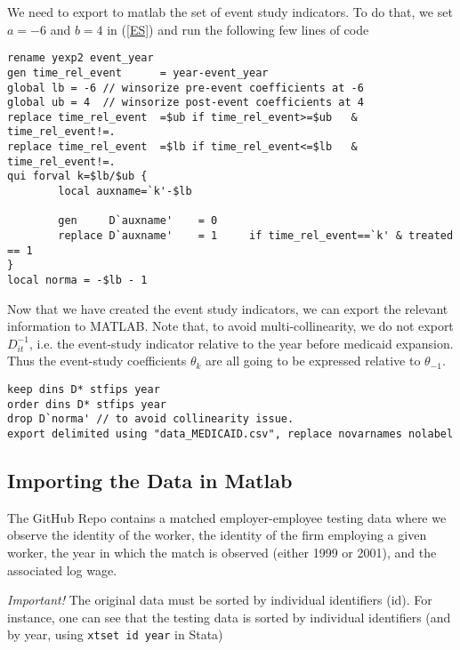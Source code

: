 \documentclass[11pt]{article}
\begin{document}
We need to export to matlab the set of event study indicators. To do that, we set $a = -6$ and $b=4$ in (\ref{ES}) and run the following few lines of code


\begin{lstlisting}
rename yexp2 event_year
gen time_rel_event 		= year-event_year
global lb = -6 // winsorize pre-event coefficients at -6
global ub = 4  // winsorize post-event coefficients at 4
replace time_rel_event	=$ub if time_rel_event>=$ub   & time_rel_event!=.
replace time_rel_event	=$lb if time_rel_event<=$lb   & time_rel_event!=.
qui forval k=$lb/$ub {
		local auxname=`k'-$lb
		
		gen 	D`auxname'	  = 0
		replace D`auxname'	  = 1 	  if time_rel_event==`k' & treated == 1
}
local norma = -$lb - 1
\end{lstlisting}
Now that we have created the event study indicators, we can export the relevant information to MATLAB. Note that, to avoid multi-collinearity, we do not export $D_{it}^{-1}$, i.e. the event-study indicator relative to the year before medicaid expansion. Thus the event-study coefficients $\theta_{k}$ are all going to be expressed relative to $\theta_{-1}$.
\begin{lstlisting}
keep dins D* stfips year
order dins D* stfips year 
drop D`norma' // to avoid collinearity issue. 
export delimited using "data_MEDICAID.csv", replace novarnames nolabel
\end{lstlisting}


    \hypertarget{importing-the-data}{%
\subsection{Importing the Data in Matlab}\label{importing-the-data}}

The GitHub Repo contains a matched employer-employee testing data where
we observe the identity of the worker, the identity of the firm
employing a given worker, the year in which the match is observed
(either 1999 or 2001), and the associated log wage.

\emph{Important!} The original data must be sorted by individual
identifiers (id). For instance, one can see that the testing data is
sorted by individual identifiers (and by year, using
\texttt{xtset\ id\ year} in Stata)
\end{document}
